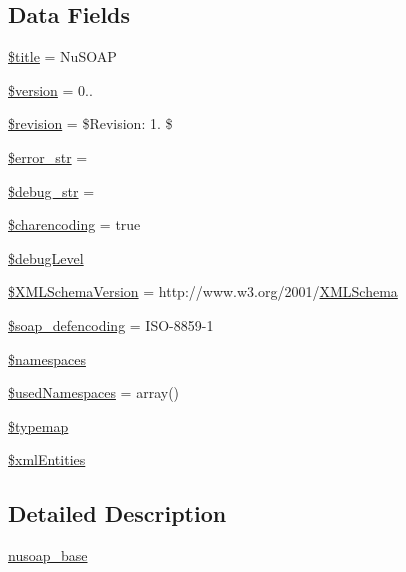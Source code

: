 \subsection*{Data Fields}
\begin{DoxyCompactItemize}
\item 
\hyperlink{classnusoap__base_ada57e7bb7c152edad18fe2f166188691}{\$title} = \textquotesingle{}Nu\+S\+O\+A\+P\textquotesingle{}
\item 
\hyperlink{classnusoap__base_a17c8948c68aa44fa9961ae169b6a8961}{\$version} = \textquotesingle{}0..\textquotesingle{}
\item 
\hyperlink{classnusoap__base_a4ff96b89e7ea5fa55acb086ecb6d0c03}{\$revision} = \textquotesingle{}\$Revision\+: 1. \$\textquotesingle{}
\item 
\hyperlink{classnusoap__base_ab9c9e44dc77820490ded7d8bf085cd7e}{\$error\+\_\+str} = \textquotesingle{}\textquotesingle{}
\item 
\hyperlink{classnusoap__base_ad04cbe402f400eb4b0b40f2c03985452}{\$debug\+\_\+str} = \textquotesingle{}\textquotesingle{}
\item 
\hyperlink{classnusoap__base_a6a4d8a570a9e0a89ef63b192fa3942f2}{\$charencoding} = true
\item 
\hyperlink{classnusoap__base_a8907cc6f1fc6ed47ef25190cb8310f41}{\$debug\+Level}
\item 
\hyperlink{classnusoap__base_a170fda624f458ce4f4b29e496ebfce4c}{\$\+X\+M\+L\+Schema\+Version} = \textquotesingle{}http\+://www.\+w3.\+org/2001/\hyperlink{class_x_m_l_schema}{X\+M\+L\+Schema}\textquotesingle{}
\item 
\hyperlink{classnusoap__base_a54cf9ddad3b51e54af1bfad78efad09a}{\$soap\+\_\+defencoding} = \textquotesingle{}I\+S\+O-\/8859-\/1\textquotesingle{}
\item 
\hyperlink{classnusoap__base_a5a7d9500de9f7c938443d65cef9a074e}{\$namespaces}
\item 
\hyperlink{classnusoap__base_a2bd7e321e4132fe338d8502a5594aebc}{\$used\+Namespaces} = array()
\item 
\hyperlink{classnusoap__base_abc776370d77b6fe463a62fa2faf26c2e}{\$typemap}
\item 
\hyperlink{classnusoap__base_a912a5d3348012e245bb16e2cab11d4cc}{\$xml\+Entities}
\end{DoxyCompactItemize}


\subsection{Detailed Description}
\hyperlink{classnusoap__base}{nusoap\+\_\+base}


